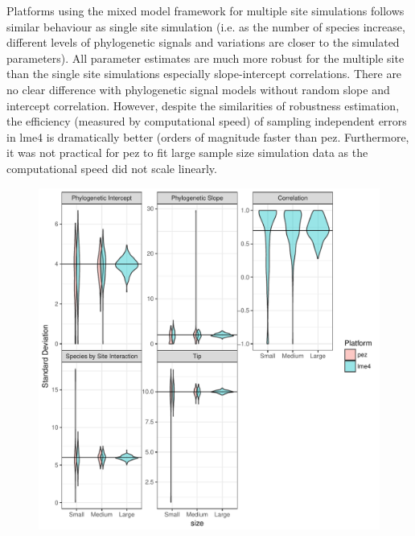 Platforms using the mixed model framework for multiple site simulations follows similar behaviour as single site simulation (i.e. as the number of species increase, different levels of phylogenetic signals and variations are closer to the simulated parameters). 
All parameter estimates are much more robust for the multiple site than the single site simulations especially slope-intercept correlations. 
There are no clear difference with phylogenetic signal models without random slope and intercept correlation.
However, despite the similarities of robustness estimation, the efficiency (measured by computational speed) of sampling independent errors in lme4 is dramatically better (orders of magnitude faster than pez.
Furthermore, it was not practical for pez to fit large sample size simulation data as the computational speed did not scale linearly.

\begin{center}
\begin{figure}[h]
\includegraphics[scale=0.8,page=1]{./csplot.pdf}
\end{figure}
\end{center}

